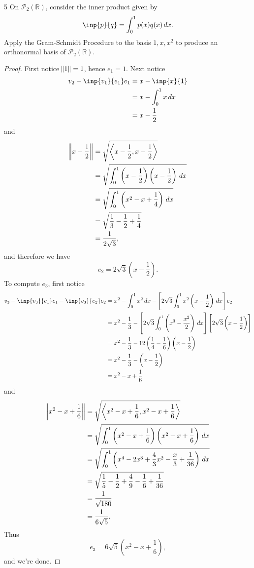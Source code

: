 \documentclass{extarticle}
\newenvironment{problem}[1]{\begin{prob*}{#1}{}}{\end{prob*}}
\newcommand{\R}{\mathbb{R}}
\newcommand{\poly}{\mathcal{P}}
\begin{document}
\begin{problem}{5}
On $\poly_2(\R)$, consider the inner product given by 
\begin{equation*}
\inp{p}{q} = \int_0^1p(x)q(x)\,dx.
\end{equation*}
Apply the Gram-Schmidt Procedure to the basis $1, x, x^2$ to produce an orthonormal basis of $\poly_2(\R)$.
\end{problem}
\begin{proof}
First notice $\norm{1} = 1$, hence $e_1 = 1$.  Next notice
\begin{align*}
v_2 - \inp{v_1}{e_1}e_1 &= x - \inp{x}{1}\\
&= x - \int_0^1x\,dx\\
&= x - \frac{1}{2}
\end{align*}
and 
\begin{align*}
\norm{x - \frac{1}{2}} &= \sqrt{\left\langle x - \frac{1}{2}, x - \frac{1}{2}\right\rangle}\\
&= \sqrt{\int_0^1\left(x - \frac{1}{2}\right)\left(x - \frac{1}{2}\right)\,dx}\\
&= \sqrt{\int_0^1\left(x^2 - x + \frac{1}{4}\right)\,dx}\\
&= \sqrt{\frac{1}{3} - \frac{1}{2} + \frac{1}{4}}\\
&= \frac{1}{2\sqrt{3}},
\end{align*}
and therefore we have
\begin{equation*}
e_2 = 2\sqrt{3}\left(x - \frac{1}{2}\right).
\end{equation*}
To compute $e_3$, first notice
\begin{align*}
v_3 - \inp{v_3}{e_1}e_1 - \inp{v_3}{e_2}e_2 &= x^2 - \int_0^1x^2\,dx - \left[2\sqrt{3}\int_0^1x^2\left(x - \frac{1}{2}\right)\,dx\right]e_2\\
&= x^2 - \frac{1}{3} -  \left[2\sqrt{3}\int_0^1\left(x^3 - \frac{x^2}{2}\right)\,dx\right]\left[2\sqrt{3}\left(x - \frac{1}{2}\right)\right]\\
&= x^2 - \frac{1}{3} - 12\left(\frac{1}{4} - \frac{1}{6}\right)\left(x - \frac{1}{2}\right)\\
&= x^2 - \frac{1}{3} - \left(x - \frac{1}{2}\right)\\
&= x^2 - x + \frac{1}{6}
\end{align*}
and 
\begin{align*}
\norm{ x^2 - x + \frac{1}{6}} &= \sqrt{\left\langle x^2 - x + \frac{1}{6},  x^2 - x + \frac{1}{6}\right\rangle}\\
&= \sqrt{\int_0^1\left( x^2 - x + \frac{1}{6}\right)\left( x^2 - x + \frac{1}{6}\right)\,dx}\\
&= \sqrt{\int_0^1\left(x^4 - 2x^3 + \frac{4}{3}x^2 - \frac{x}{3} + \frac{1}{36}\right)\,dx}\\
&= \sqrt{\frac{1}{5} - \frac{1}{2} + \frac{4}{9} - \frac{1}{6} + \frac{1}{36}}\\
&= \frac{1}{\sqrt{180}}\\
&= \frac{1}{6\sqrt{5}}.
\end{align*}
Thus
\begin{equation*}
e_3 = 6\sqrt{5}\left(x^2 - x + \frac{1}{6}\right),
\end{equation*}
and we're done.
\end{proof}
\end{document}
